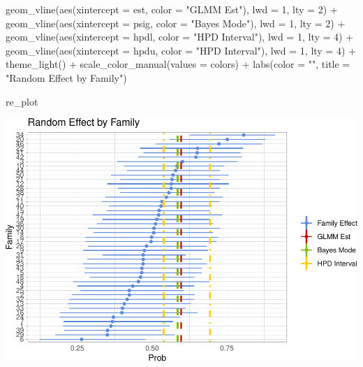 \documentclass[
]{article}
\newenvironment{Shaded}{\begin{snugshade}}{\end{snugshade}}
\newcommand{\AttributeTok}[1]{\textcolor[rgb]{0.77,0.63,0.00}{#1}}
\newcommand{\DecValTok}[1]{\textcolor[rgb]{0.00,0.00,0.81}{#1}}
\newcommand{\FunctionTok}[1]{\textcolor[rgb]{0.00,0.00,0.00}{#1}}
\newcommand{\NormalTok}[1]{#1}
\newcommand{\SpecialCharTok}[1]{\textcolor[rgb]{0.00,0.00,0.00}{#1}}
\newcommand{\StringTok}[1]{\textcolor[rgb]{0.31,0.60,0.02}{#1}}
\begin{document}
\begin{Shaded}
\begin{Highlighting}[]
  \FunctionTok{geom\_vline}\NormalTok{(}\FunctionTok{aes}\NormalTok{(}\AttributeTok{xintercept =}\NormalTok{ est, }\AttributeTok{color =} \StringTok{"GLMM Est"}\NormalTok{), }\AttributeTok{lwd =} \DecValTok{1}\NormalTok{, }\AttributeTok{lty =} \DecValTok{2}\NormalTok{) }\SpecialCharTok{+}
  \FunctionTok{geom\_vline}\NormalTok{(}\FunctionTok{aes}\NormalTok{(}\AttributeTok{xintercept =}\NormalTok{ psig, }\AttributeTok{color =} \StringTok{"Bayes Mode"}\NormalTok{), }\AttributeTok{lwd =} \DecValTok{1}\NormalTok{, }\AttributeTok{lty =} \DecValTok{2}\NormalTok{) }\SpecialCharTok{+}
  \FunctionTok{geom\_vline}\NormalTok{(}\FunctionTok{aes}\NormalTok{(}\AttributeTok{xintercept =}\NormalTok{ hpdl, }\AttributeTok{color =} \StringTok{"HPD Interval"}\NormalTok{), }\AttributeTok{lwd =} \DecValTok{1}\NormalTok{, }\AttributeTok{lty =} \DecValTok{4}\NormalTok{) }\SpecialCharTok{+}
  \FunctionTok{geom\_vline}\NormalTok{(}\FunctionTok{aes}\NormalTok{(}\AttributeTok{xintercept =}\NormalTok{ hpdu, }\AttributeTok{color =} \StringTok{"HPD Interval"}\NormalTok{), }\AttributeTok{lwd =} \DecValTok{1}\NormalTok{, }\AttributeTok{lty =} \DecValTok{4}\NormalTok{) }\SpecialCharTok{+}
  \FunctionTok{theme\_light}\NormalTok{() }\SpecialCharTok{+}
  \FunctionTok{scale\_color\_manual}\NormalTok{(}\AttributeTok{values =}\NormalTok{ colors) }\SpecialCharTok{+}
  \FunctionTok{labs}\NormalTok{(}\AttributeTok{color =} \StringTok{""}\NormalTok{, }\AttributeTok{title =} \StringTok{"Random Effect by Family"}\NormalTok{)}

\NormalTok{re\_plot}
\end{Highlighting}
\end{Shaded}

\includegraphics{final_report_files/figure-latex/re_plot-1.pdf}
\end{document}
